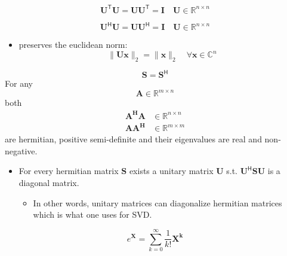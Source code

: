 \noindent\begin{equation*}
    \mathbf{U}^{\mathsf{T}}\mathbf{U}=\mathbf{UU}^{\mathsf{T}}=\mathbf{I}\quad \mathbf{U}\in \mathbb{R}^{n\times n}
\end{equation*}

\noindent\begin{equation*}
    \mathbf{U}^{\mathsf{H}}\mathbf{U}=\mathbf{UU}^{\mathsf{H}}=\mathbf{I}\quad \mathbf{U}\in \mathbb{R}^{n\times n}
\end{equation*}
\begin{itemize}
    \item preserves the euclidean norm:
          \noindent\begin{equation*}
              \|\mathbf{Ux}\| _2=\|\mathbf{x}\|_2 \quad \forall \mathbf{x} \in \mathbb{C}^n
          \end{equation*}
\end{itemize}

\noindent\begin{equation*}
    \mathbf{S}=\mathbf{S}^{\mathsf{H}}
\end{equation*}
For any
\noindent\begin{equation*}
    \mathbf{A} \in \mathbb{R}^{m\times n}
\end{equation*}
both
\noindent\begin{align*}
    \mathbf{A^H A} & \in \mathbb{R}^{n\times n} \\
    \mathbf{A A^H} & \in \mathbb{R}^{m\times m}
\end{align*}
are hermitian, positive semi-definite and their eigenvalues are real and non-negative.
\begin{itemize}
    \item For every hermitian matrix $\mathbf{S}$ exists a unitary matrix $\mathbf{U}$ s.t. $\mathbf{U}^{\mathsf{H}}\mathbf{SU}$ is a diagonal matrix.
          \begin{itemize}
              \item In other words, unitary matrices can diagonalize hermitian matrices which is what one uses for SVD.
          \end{itemize}
\end{itemize}

\newpar{}
\begin{equation*}
    e^{\mathbf{X}} = \sum_{k=0}^{\infty}\frac{1}{k!}\mathbf{X^k}
\end{equation*}